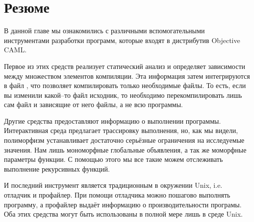 \section{Резюме}
\label{sec:summary_10}

В данной главе мы ознакомились с различными вспомогательными инструментами 
разработки программ, которые входят в дистрибутив Objective CAML.

Первое из этих средств реализует статический анализ и определяет зависимости 
между множеством элементов компиляции. Эта информация затем интегрируются в файл 
, что позволяет компилировать только необходимые файлы. То есть, 
если вы изменили какой--то файл исходник, то необходимо перекомпилировать лишь 
сам файл и зависящие от него файлы, а не всю программы.

Другие средства предоставляют информацию о выполнении программы. Интерактивная 
среда предлагает трассировку выполнения, но, как мы видели, полиморфизм 
устанавливает достаточно серьёзные ограничения на исследуемые значения. Нам 
 лишь мономорфные глобальные объявления, а так же моморфные 
параметры функции. С помощью этого мы все такие можем отслеживать выполнение 
рекурсивных функций. 

И последний инструмент является традиционным в окружении Unix, i.e. отладчик и 
профайлер. При помощи отладчика можно пошагово выполнять программу, а профайлер 
выдаёт информацию о производительности програмы. Оба этих средства могут быть 
использованы в полной мере лишь в среде Unix.
